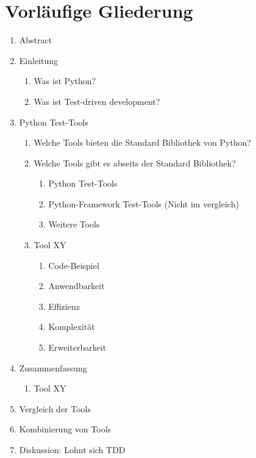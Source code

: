 \section{Vorläufige Gliederung}
\begin{enumerate}[label*=\arabic*.]
    \item Abstract
    \item Einleitung
    \begin{enumerate}[label*=\arabic*.]
        \item Was ist Python?
        \item Was ist Test-driven development?
    \end{enumerate}
    \item Python Test-Tools
    \begin{enumerate}[label*=\arabic*.]
        \item Welche Tools bieten die Standard Bibliothek von Python?
        \item Welche Tools gibt es abseits der Standard Bibliothek?
        \begin{enumerate}[label*=\arabic*.]
            \item Python Test-Tools
            \item Python-Framework Test-Tools (Nicht im vergleich)
            \item Weitere Tools
        \end{enumerate}
        \item Tool XY
        \begin{enumerate}[label*=\arabic*.]
            \item Code-Beispiel
            \item Anwendbarkeit
            \item Effizienz
            \item Komplexität
            \item Erweiterbarkeit
        \end{enumerate}
    \end{enumerate}
    \item Zusammenfassung
    \begin{enumerate}[label*=\arabic*.]
        \item Tool XY
    \end{enumerate}
    \item Vergleich der Tools
    \item Kombinierung von Tools
    \item Diskussion: Lohnt sich TDD
    \begin{enumerate}[label*=\arabic*.]

\end{enumerate}
\end{enumerate}
